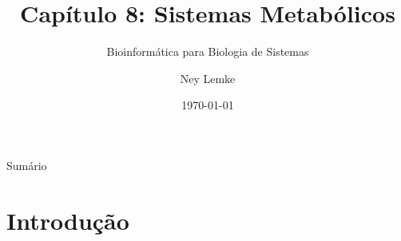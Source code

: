 


\title[Cap. 8: Sistemas Metabólicos]{Capítulo 8: Sistemas Metabólicos}
\subtitle{Bioinformática para Biologia de Sistemas}
\author{Ney Lemke}
\date{\today}



\begin{frame}
\titlepage
\end{frame}

\begin{frame}{Sumário}
\tableofcontents
\end{frame}

\section{Introdução}

